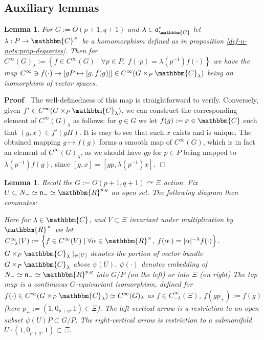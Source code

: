 \documentclass{article}
\newcommand{\assign}{:=}
\renewenvironment{proof}{\noindent\textbf{Proof\ }}{\hspace*{\fill}$\Box$\medskip}
\newtheorem{lemma}[proposition]{Lemma}
\theoremstyle{remark}
\begin{document}
\subsection{Auxiliary lemmas}

\begin{lemma}
  \label{sol:lem-unfold}For $G \assign O (p + 1, q + 1)$ and $\lambda \in
  \mathfrak{a}_{\mathbbm{C}}^{\ast}$ let $\lambda : P \rightarrow
  \mathbbm{C}^{\times}$ be a homomorphism defined as in proposition
  \ref{def-n-nots:prop-degseries}. Then for $C^{\infty} (G)_{\lambda} \assign
  \left\{ f \in C^{\infty} (G) \mid \forall p \in P, \; f (\cdot p) =
  \lambda (p^{- 1}) f (\cdot) \right\}$ we have the map $C^{\infty} \ni f
  (\cdot) \mapsto [g P \mapsto [g, f (g)]] \in C^{\infty} (G \times_P
  \mathbbm{C}_{\lambda})$ being an isomorphism of vector spaces.
\end{lemma}

\begin{proof}
  The well-definedness of this map is straightforward to verify. Conversely,
  given $f' \in C^{\infty} (G \times_P \mathbbm{C}_{\lambda})$, we can
  construct the corresponding element of $C^{\infty} (G)_{\lambda}$ as
  follows: for $g \in G$ we let $f (g) \assign x \in \mathbbm{C}$ such that
  $(g, x) \in f' (g H)$. It is easy to see that such $x$ exists and is unique.
  The obtained mapping $g \mapsto f (g)$ forms a smooth map of $C^{\infty}
  (G)$, which is in fact an element of $C^{\infty} (G)_{\lambda}$, as we
  should have $g p$ for $p \in P$ being mapped to $\lambda (p^{- 1}) f (g)$,
  since $[g, x] = [g p, \lambda (p^{- 1}) x]$.
\end{proof}

\begin{lemma}
  \label{sol:lem-commdiag}Recall the $G \assign O (p + 1, q + 1)
  \curvearrowright \Xi$ action. Fix $U \subset N_- \simeq \mathfrak{n}_-
  \simeq \mathbbm{R}^{p, q}$ an open set. The following diagram then commutes:
  
  
  Here for $\lambda \in \mathbbm{C}$, and $V \subset \Xi$ invariant under
  multiplication by $\mathbbm{R}^{\times}$ we let $C^{\infty}_{- \lambda} (V)
  \assign \left\{ f \in C^{\infty} (V) \mid \forall \alpha \in
  \mathbbm{R}^{\times}, \; f (\alpha \cdot) = | \alpha |^{- \lambda} f (\cdot)
  \right\}$. $G \times_P \mathbbm{C}_{\lambda} \mid_{\psi (U)}$ denotes
  the portion of vector bundle $G \times_P \mathbbm{C}_{\lambda}$ above $\psi
  (U)$. $\psi (\cdot)$ denotes embedding of $N_- \simeq \mathfrak{n}_- \simeq
  \mathbbm{R}^{p, q}$ into $G / P$ (on the left) or into $\Xi$ (on right) The
  top map is a continuous $G$-equivariant isomorphism, defined for $f (\cdot)
  \in C^{\infty} (G \times_P \mathbbm{C}_{\lambda}) \simeq C^{\infty}
  (G)_{\lambda}$ as $\tilde{f} \in C^{\infty}_{- \lambda} (\Xi)$, $\tilde{f}
  (g p_+) \assign f (g)$ (here $p_+ \assign (1, 0_{p + q}, 1) \in \Xi$). The
  left vertical arrow is a restriction to an open subset $\psi (U) P \subset G
  / P$. The right-vertical arrow is restriction to a submanifold $U \cdot (1,
  0_{p + q}, 1) \subset \Xi$.
\end{lemma}
\end{document}
